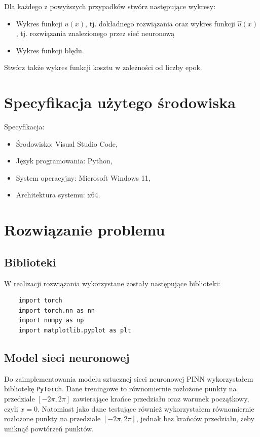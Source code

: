 \documentclass[11pt, leqno]{scrartcl}
\begin{document}
    Dla każdego z powyższych przypadków stwórz następujące
    wykresy:
    \begin{itemize}[label=--]
        \item Wykres funkcji $u(x)$, tj. dokładnego rozwiązania
            oraz wykres funkcji $\hat{u}(x)$, tj. rozwiązania
            znalezionego przez sieć neuronową
        \item Wykres funkcji błędu.
    \end{itemize}
    Stwórz także wykres funkcji kosztu w zależności od liczby epok.

    \section{Specyfikacja użytego środowiska}
    Specyfikacja:
    \begin{itemize}
        \item Środowisko: Visual Studio Code,
        \item Język programowania: Python,
        \item System operacyjny: Microsoft Windows 11,
        \item Architektura systemu: x64.
    \end{itemize}

    \section{Rozwiązanie problemu}
    \subsection{Biblioteki}
    W realizacji rozwiązania wykorzystane zostały następujące
    biblioteki:
    \begin{lstlisting}
    import torch
    import torch.nn as nn
    import numpy as np
    import matplotlib.pyplot as plt
    \end{lstlisting}

    \subsection{Model sieci neuronowej}
    Do zaimplementowania modelu sztucznej sieci neuronowej PINN
    wykorzystałem bibliotekę \texttt{PyTorch}. Dane treningowe to
    równomiernie rozłożone punkty na przedziale $[-2\pi,2\pi]$
    zawierające krańce przedziału oraz warunek początkowy, czyli
    $x=0$. Natomiast jako dane testujące również wykorzystałem
    równomiernie rozłożone punkty na przedziale $[-2\pi,2\pi]$,
    jednak bez krańców przedziału, żeby uniknąć powtórzeń punktów.
\end{document}
